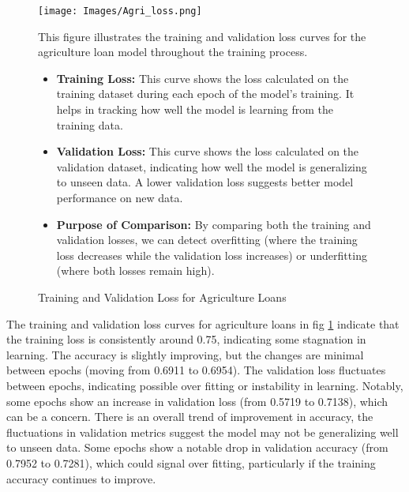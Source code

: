 \documentclass[a4paper]{article}
\begin{document}
\begin{figure}[H]
	\centering
	\texttt{[image: Images/Agri\_loss.png]} %
	\caption{Training and Validation Loss for Agriculture Loans}
	\label{fig:agriculture_loan_loss}
	\vspace{1em} %
	\begin{minipage}{0.8\textwidth}
		 This figure illustrates the training and validation loss curves for the agriculture loan model throughout the training process.
		\begin{itemize}
			\item \textbf{Training Loss:} This curve shows the loss calculated on the training dataset during each epoch of the model's training. It helps in tracking how well the model is learning from the training data.
			\item \textbf{Validation Loss:} This curve shows the loss calculated on the validation dataset, indicating how well the model is generalizing to unseen data. A lower validation loss suggests better model performance on new data.
			\item \textbf{Purpose of Comparison:} By comparing both the training and validation losses, we can detect overfitting (where the training loss decreases while the validation loss increases) or underfitting (where both losses remain high).
		\end{itemize}
	\end{minipage}
\end{figure}

\vspace{1cm}

\noindent The training and validation loss curves for agriculture loans in fig \ref{fig:agriculture_loan_loss} indicate that the training loss is consistently around 0.75, indicating some stagnation in learning. The accuracy is slightly improving, but the changes are minimal between epochs (moving from 0.6911 to 0.6954).  The validation loss fluctuates between epochs, indicating possible over fitting or instability in learning. Notably, some epochs show an increase in validation loss (from 0.5719 to 0.7138), which can be a concern.  There is an overall trend of improvement in accuracy, the fluctuations in validation metrics suggest the model may not be generalizing well to unseen data.  Some epochs show a notable drop in validation accuracy (from 0.7952 to 0.7281), which could signal over fitting, particularly if the training accuracy continues to improve. \\
\end{document}
